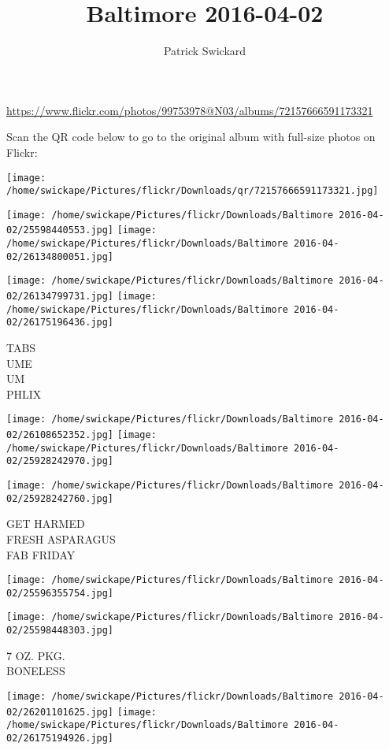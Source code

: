 \documentclass[10pt,letterpaper]{article}
\title{Baltimore 2016-04-02}
\author{Patrick Swickard}
\date{}
\begin{document}
\maketitle

\url{https://www.flickr.com/photos/99753978@N03/albums/72157666591173321}

Scan the QR code below to go to the original album with full-size photos on Flickr:

\texttt{[image: /home/swickape/Pictures/flickr/Downloads/qr/72157666591173321.jpg]}
\pagebreak

\texttt{[image: /home/swickape/Pictures/flickr/Downloads/Baltimore 2016-04-02/25598440553.jpg]}
\texttt{[image: /home/swickape/Pictures/flickr/Downloads/Baltimore 2016-04-02/26134800051.jpg]}

\texttt{[image: /home/swickape/Pictures/flickr/Downloads/Baltimore 2016-04-02/26134799731.jpg]}
\texttt{[image: /home/swickape/Pictures/flickr/Downloads/Baltimore 2016-04-02/26175196436.jpg]}

TABS\\
UME\\
UM\\
PHLIX
\pagebreak

\texttt{[image: /home/swickape/Pictures/flickr/Downloads/Baltimore 2016-04-02/26108652352.jpg]}
\texttt{[image: /home/swickape/Pictures/flickr/Downloads/Baltimore 2016-04-02/25928242970.jpg]}

\texttt{[image: /home/swickape/Pictures/flickr/Downloads/Baltimore 2016-04-02/25928242760.jpg]}

GET HARMED\\
FRESH ASPARAGUS\\
FAB FRIDAY
\pagebreak

\texttt{[image: /home/swickape/Pictures/flickr/Downloads/Baltimore 2016-04-02/25596355754.jpg]}

\vspace{0.25in}
\texttt{[image: /home/swickape/Pictures/flickr/Downloads/Baltimore 2016-04-02/25598448303.jpg]}

7 OZ. PKG.\\
BONELESS
\pagebreak

\texttt{[image: /home/swickape/Pictures/flickr/Downloads/Baltimore 2016-04-02/26201101625.jpg]}
\texttt{[image: /home/swickape/Pictures/flickr/Downloads/Baltimore 2016-04-02/26175194926.jpg]}
\end{document}
